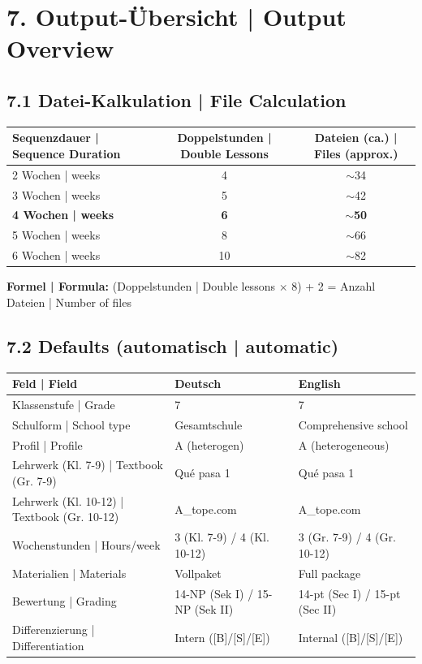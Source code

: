 \documentclass[11pt,a4paper]{article}
\begin{document}
\newpage

\section*{\textcolor{spanisch}{7. Output-Übersicht | Output Overview}}

\subsection*{7.1 Datei-Kalkulation | File Calculation}

\begin{tabularx}{\textwidth}{|l|c|c|}
\hline
\rowcolor{lightgray}
\textbf{Sequenzdauer | Sequence Duration} & \textbf{Doppelstunden | Double Lessons} & \textbf{Dateien (ca.) | Files (approx.)} \\
\hline
2 Wochen | weeks & 4 & $\sim$34 \\
\hline
3 Wochen | weeks & 5 & $\sim$42 \\
\hline
\textbf{4 Wochen | weeks} & \textbf{6} & \textbf{$\sim$50} \\
\hline
5 Wochen | weeks & 8 & $\sim$66 \\
\hline
6 Wochen | weeks & 10 & $\sim$82 \\
\hline
\end{tabularx}

\vspace{0.3cm}
\textbf{Formel | Formula:} (Doppelstunden | Double lessons $\times$ 8) + 2 = Anzahl Dateien | Number of files

\subsection*{7.2 Defaults (automatisch | automatic)}

\begin{tabularx}{\textwidth}{|l|X|X|}
\hline
\rowcolor{lightgray}
\textbf{Feld | Field} & \textbf{Deutsch} & \textbf{English} \\
\hline
Klassenstufe | Grade & 7 & 7 \\
\hline
Schulform | School type & Gesamtschule & Comprehensive school \\
\hline
Profil | Profile & A (heterogen) & A (heterogeneous) \\
\hline
Lehrwerk (Kl. 7-9) | Textbook (Gr. 7-9) & Qué pasa 1 & Qué pasa 1 \\
\hline
Lehrwerk (Kl. 10-12) | Textbook (Gr. 10-12) & A\_tope.com & A\_tope.com \\
\hline
Wochenstunden | Hours/week & 3 (Kl. 7-9) / 4 (Kl. 10-12) & 3 (Gr. 7-9) / 4 (Gr. 10-12) \\
\hline
Materialien | Materials & Vollpaket & Full package \\
\hline
Bewertung | Grading & 14-NP (Sek I) / 15-NP (Sek II) & 14-pt (Sec I) / 15-pt (Sec II) \\
\hline
Differenzierung | Differentiation & Intern ([B]/[S]/[E]) & Internal ([B]/[S]/[E]) \\
\hline
\end{tabularx}
\end{document}

